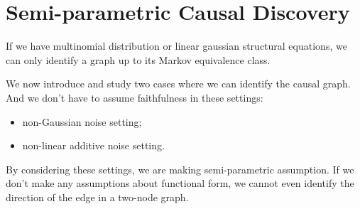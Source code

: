 \section{Semi-parametric Causal Discovery}
\begin{definition}
    If we have multinomial distribution or linear gaussian structural equations,
    we can only identify a graph up to its Markov equivalence class.
\end{definition}

We now introduce and study two cases where we can identify the causal graph. And
we don't have to assume faithfulness in these settings:
\begin{itemize}
    \item non-Gaussian noise setting;
    \item non-linear additive noise setting.
\end{itemize}
By considering these settings, we are making semi-parametric assumption. If we
don't make any assumptions about functional form, we cannot even identify the 
direction of the edge in a two-node graph.

